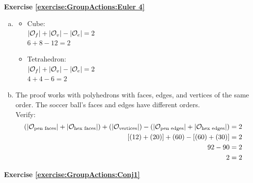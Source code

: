  
\noindent\textbf{Exercise \ref{exercise:GroupActions:Euler 4}}
\begin{enumerate}[(a)]
\item 
	\begin{itemize}
	\item
	Cube:
	\\
	$|{\cal O}_f| + |{\cal O}_v| - |{\cal O}_e| = 2$
	\\
	$6 + 8 -12 = 2$
	
	\item
	Tetrahedron:
	\\
	$|{\cal O}_f| + |{\cal O}_v| - |{\cal O}_e| = 2$
	\\
	$4 + 4 - 6 = 2$
	\end{itemize}
	
\item 
The proof works with polyhedrons with faces, edges, and vertices of the same order.  The soccer ball's faces and edges have different orders.
\\
Verify:
\begin{align*}
(|{\cal O}_{\text{pen faces}}| + |{\cal O}_{\text{hex faces}}|) +  (|{\cal O}_{\text{vertices}}|)  -  (|{\cal O}_{\text{pen edges}}| + |{\cal O}_{\text{hex edges}}|) &= 2 
\\
[(12) + (20)] + (60) - [(60) + (30)] &= 2 
\\
92 - 90 &= 2
\\
2 &= 2 
\end{align*}
\end{enumerate}
 
\noindent\textbf{Exercise \ref{exercise:GroupActions:Conj1}}

